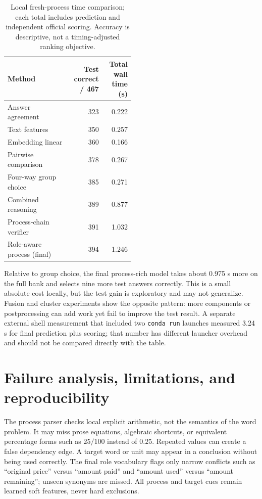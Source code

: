 \documentclass[10pt,a4paper]{article}
\newcommand{\code}[1]{\texttt{#1}}
\begin{document}
\begin{table}[ht]
\centering\small
\caption{Local fresh-process time comparison; each total includes prediction and independent official scoring. Accuracy is descriptive, not a timing-adjusted ranking objective.}
\begin{tabular}{@{}p{0.50\linewidth}rr@{}}
\toprule
Method & Test correct / 467 & Total wall time (s) \\
\midrule
Answer agreement & 323 & 0.222 \\
Text features & 350 & 0.257 \\
Embedding linear & 360 & 0.166 \\
Pairwise comparison & 378 & 0.267 \\
Four-way group choice & 385 & 0.271 \\
Combined reasoning & 389 & 0.877 \\
Process-chain verifier & 391 & 1.032 \\
Role-aware process (final) & 394 & 1.246 \\
\bottomrule
\end{tabular}
\end{table}

Relative to group choice, the final process-rich model takes about 0.975 s more on the full bank and selects nine more test answers correctly. This is a small absolute cost locally, but the test gain is exploratory and may not generalize. Fusion and cluster experiments show the opposite pattern: more components or postprocessing can add work yet fail to improve the test result. A separate external shell measurement that included two \code{conda run} launches measured 3.24 s for final prediction plus scoring; that number has different launcher overhead and should not be compared directly with the table.

\section{Failure analysis, limitations, and reproducibility}
The process parser checks local explicit arithmetic, not the semantics of the word problem. It may miss prose equations, algebraic shortcuts, or equivalent percentage forms such as $25/100$ instead of $0.25$. Repeated values can create a false dependency edge. A target word or unit may appear in a conclusion without being used correctly. The final role vocabulary flags only narrow conflicts such as ``original price'' versus ``amount paid'' and ``amount used'' versus ``amount remaining''; unseen synonyms are missed. All process and target cues remain learned soft features, never hard exclusions.
\end{document}
